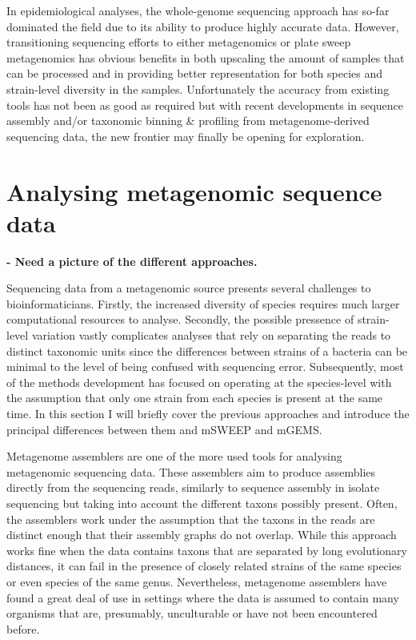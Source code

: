 \documentclass[officiallayout]{tktla}
\begin{document}
In epidemiological analyses, the whole-genome sequencing approach has
so-far dominated the field due to its ability to produce highly
accurate data. However, transitioning sequencing efforts to either
metagenomics or plate sweep metagenomics has obvious benefits in both
upscaling the amount of samples that can be processed and in providing
better representation for both species and strain-level diversity in
the samples. Unfortunately the accuracy from existing tools has not
been as good as required but with recent developments in sequence
assembly and/or taxonomic binning \& profiling from metagenome-derived
sequencing data, the new frontier may finally be opening for
exploration.

\section{Analysing metagenomic sequence data}

\textbf{- Need a picture of the different approaches.}

Sequencing data from a metagenomic source presents several challenges
to bioinformaticians. Firstly, the increased diversity of species
requires much larger computational resources to analyse. Secondly, the
possible pressence of strain-level variation vastly complicates
analyses that rely on separating the reads to distinct taxonomic units
since the differences between strains of a bacteria can be minimal to
the level of being confused with sequencing error. Subsequently, most
of the methods development has focused on operating at the
species-level with the assumption that only one strain from each
species is present at the same time. In this section I will briefly
cover the previous approaches and introduce the principal differences
between them and mSWEEP and mGEMS.

Metagenome assemblers are one of the more used tools for analysing
metagenomic sequencing data. These assemblers aim to produce
assemblies directly from the sequencing reads, similarly to sequence
assembly in isolate sequencing but taking into account the different
taxons possibly present. Often, the assemblers work under the
assumption that the taxons in the reads are distinct enough that their
assembly graphs do not overlap. While this approach works fine when
the data contains taxons that are separated by long evolutionary
distances, it can fail in the presence of closely related strains of
the same species or even species of the same genus. Nevertheless,
metagenome assemblers have found a great deal of use in settings where
the data is assumed to contain many organisms that are, presumably,
unculturable or have not been encountered before.
\end{document}

